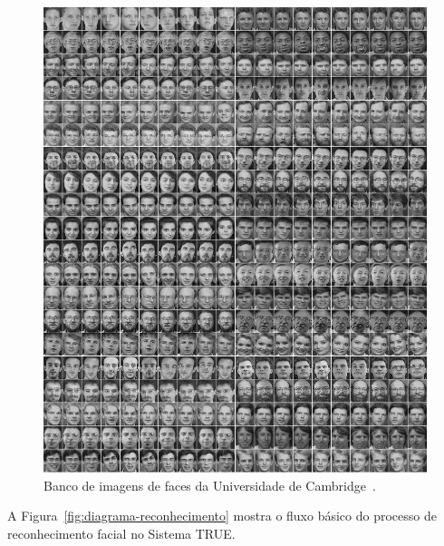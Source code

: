 		\begin{figure}[H]
			\begin{center}
				\includegraphics[scale=0.4]{figuras/4.ProblemaEProposta/cambrigdefacedb.png}
			\end{center}
			\caption{Banco de imagens de faces da Universidade de Cambridge~\cite{cambridgeFaceDb}.}
			\label{fig:cambridgeFaceDb}
		\end{figure}

		A Figura~\ref{fig:diagrama-reconhecimento} mostra o fluxo básico do processo de reconhecimento facial no Sistema TRUE.

